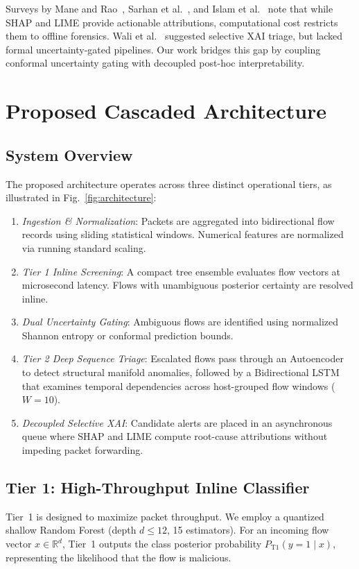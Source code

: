\documentclass[conference]{IEEEtran}
\begin{document}
Surveys by Mane and Rao~\cite{mane2021explaining}, Sarhan et al.~\cite{sarhan2023evaluating}, and Islam et al.~\cite{islam2023xai} note that while SHAP and LIME provide actionable attributions, computational cost restricts them to offline forensics. Wali et al.~\cite{wali2025explainable} suggested selective XAI triage, but lacked formal uncertainty-gated pipelines. Our work bridges this gap by coupling conformal uncertainty gating with decoupled post-hoc interpretability.

\section{Proposed Cascaded Architecture}

\subsection{System Overview}
The proposed architecture operates across three distinct operational tiers, as illustrated in Fig.~\ref{fig:architecture}:
\begin{enumerate}
    \item \textit{Ingestion \& Normalization}: Packets are aggregated into bidirectional flow records using sliding statistical windows. Numerical features are normalized via running standard scaling.
    \item \textit{Tier 1 Inline Screening}: A compact tree ensemble evaluates flow vectors at microsecond latency. Flows with unambiguous posterior certainty are resolved inline.
    \item \textit{Dual Uncertainty Gating}: Ambiguous flows are identified using normalized Shannon entropy or conformal prediction bounds.
    \item \textit{Tier 2 Deep Sequence Triage}: Escalated flows pass through an Autoencoder to detect structural manifold anomalies, followed by a Bidirectional LSTM that examines temporal dependencies across host-grouped flow windows ($W=10$).
    \item \textit{Decoupled Selective XAI}: Candidate alerts are placed in an asynchronous queue where SHAP and LIME compute root-cause attributions without impeding packet forwarding.
\end{enumerate}

\subsection{Tier 1: High-Throughput Inline Classifier}
Tier~1 is designed to maximize packet throughput. We employ a quantized shallow Random Forest (depth $d \le 12$, 15 estimators). For an incoming flow vector $x \in \mathbb{R}^d$, Tier~1 outputs the class posterior probability $P_{\text{T1}}(y = 1 \mid x)$, representing the likelihood that the flow is malicious.
\end{document}
